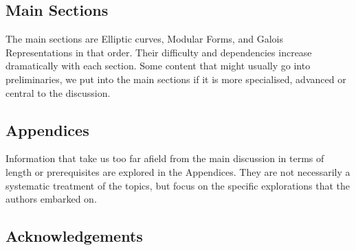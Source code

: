 \documentclass{article}
\theoremstyle{definition}
\theoremstyle{definition}
\theoremstyle{definition}
\begin{document}

\subsection{Main Sections}

The main sections are Elliptic curves, Modular Forms, and Galois Representations in that order. Their difficulty and dependencies increase dramatically with each section. Some content that might usually go into preliminaries, we put into the main sections if it is more specialised, advanced or central to the discussion.

\subsection{Appendices}

Information that take us too far afield from the main discussion in terms of length or prerequisites are explored in the Appendices. They are not necessarily a systematic treatment of the topics, but focus on the specific explorations that the authors embarked on.




\subsection{Acknowledgements}
\end{document}
